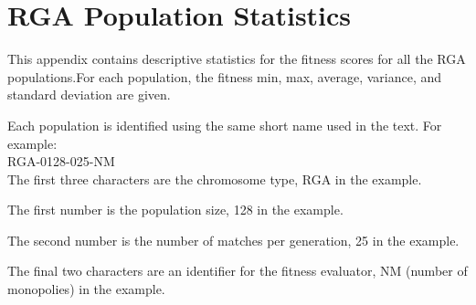 \clearpage
\chapter{RGA Population Statistics}
\label{appendix:rgastats}

This appendix contains descriptive statistics for the fitness scores for all the
RGA populations.For each population, the fitness min, max, average, variance,
and standard deviation are given.

Each population is identified using the same short name used in the text. For
example: \\ 

RGA-0128-025-NM \\ 

The first three characters are the chromosome type, RGA in the example.

The first number is the population size, 128 in the example.

The second number is the number of matches per generation, 25 in the example.

The final two characters are an identifier for the fitness evaluator, NM
(number of monopolies) in the example.

\newpage



















